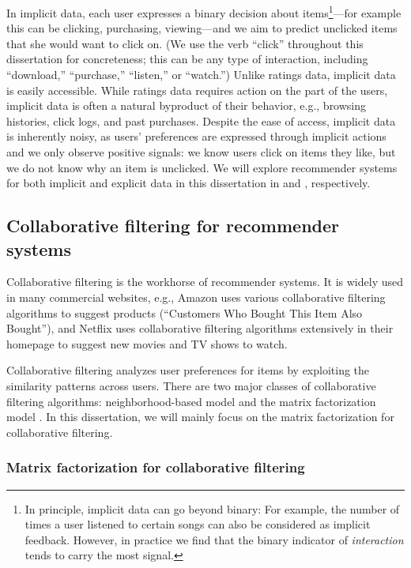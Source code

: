 In implicit data, each user expresses a binary decision about items\footnote{In principle, implicit data can go beyond binary: For example, the number of times a user listened to certain songs can also be considered as implicit feedback. However, in practice we find that the binary indicator of \textit{interaction} tends to carry the most signal. }---for
example this can be clicking, purchasing, viewing---and we aim to
predict unclicked items that she would want to click on. (We use the verb ``click'' throughout this dissertation for concreteness; this can be any type of interaction, including
``download,'' ``purchase,'' ``listen,'' or ``watch.'') Unlike
ratings data, implicit data is easily accessible. While ratings data
requires action on the part of the users, implicit data is often a
natural byproduct of their behavior, e.g., browsing histories, click
logs, and past purchases. Despite the ease of access, implicit data is inherently noisy, as users' preferences are expressed through implicit actions and we only observe positive signals: we know users click on items they like, but we do not know why an item is unclicked. We will explore recommender systems for both implicit and explicit data in this dissertation in  and , respectively.

\subsection{Collaborative filtering for recommender systems} \label{chpt:background:sec:cf}

Collaborative filtering is the workhorse of recommender systems. It is widely used in many commercial websites, e.g., Amazon uses various collaborative filtering algorithms to suggest products (``Customers Who Bought This Item Also Bought''), and Netflix uses collaborative filtering algorithms extensively in their homepage to suggest new movies and TV shows to watch.

Collaborative filtering analyzes user preferences for items by exploiting the similarity patterns across users. There are two major classes of collaborative filtering algorithms: neighborhood-based model \citep{sarwar2001item} and the matrix factorization model \citep{koren2009matrix}. In this dissertation, we will mainly focus on the matrix factorization for collaborative filtering. 

\subsubsection{Matrix factorization for collaborative filtering} 
\label{chpt:background:sec:mf_cf}

